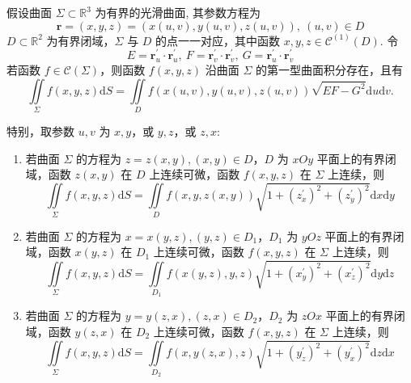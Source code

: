 \begin{theorem}[第一型曲面积分化为二重积分]
    假设曲面 $ \varSigma \subset \mathbb{R}^{3} $ 为有界的光滑曲面, 其参数方程为
    $$\boldsymbol{r}=(x, y, z)=(x(u, v), y(u, v), z(u, v)), ~ (u, v) \in D$$
    $D \subset \mathbb{R}^{2} $ 为有界闭域，$\varSigma $ 与 $ D $ 的点一一对应，其中函数 $ x, y, z \in \mathscr{C}^{(1)}(D) $. 令
    $$E=\boldsymbol{r}_{u}^{\prime} \cdot \boldsymbol{r}_{u}^{\prime}, ~  F=\boldsymbol{r}_{v}^{\prime} \cdot \boldsymbol{r}_{v}^{\prime}, ~  G=\boldsymbol{r}_{u}^{\prime} \cdot \boldsymbol{r}_{v}^{\prime}$$
    若函数 $ f \in \mathscr{C}(\varSigma) $，则函数 $ f(x, y, z) $ 沿曲面 $ \varSigma $ 的第一型曲面积分存在，且有
    $$\iint\limits_{\varSigma} f(x, y, z) \mathrm{d} S=\iint\limits_{D} f(x(u, v), y(u, v), z(u, v)) \sqrt{EF-G^{2}} \mathrm{d} u \mathrm{d} v.$$
    
    特别，取参数 $ u, v $ 为 $ x, y $，或 $ y, z $，或 $ z, x $:
    \begin{enumerate}[label=(\arabic{*})]
        \item 若曲面 $ \varSigma $ 的方程为 $ z=z(x, y),(x, y) \in D$，$D $ 为 $ x O y $ 平面上的有界闭域，函数 $ z(x, y) $ 在 $ D $ 上连续可微，函数 $ f(x, y, z) $ 在 $ \varSigma $ 上连续，则
              $$\iint\limits_{\varSigma} f(x, y, z) \mathrm{d} S=\iint\limits_{D} f(x, y, z(x, y)) \sqrt{1+\left(z_{x}^{\prime}\right)^{2}+\left(z_{y}^{\prime}\right)^{2}} \mathrm{d} x \mathrm{d} y$$
        \item 若曲面 $ \varSigma $ 的方程为 $ x=x(y, z),(y, z) \in D_{1}$，$D_{1} $ 为 $ y O z $ 平面上的有界闭域，函数 $ x(y, z) $ 在 $ D_{1} $ 上连续可微，函数 $ f(x, y, z) $ 在 $ \varSigma $ 上连续，则
              $$\iint\limits_{\varSigma} f(x, y, z) \mathrm{d} S=\iint\limits_{D_{1}} f(x(y, z), y, z) \sqrt{1+\left(x_{y}^{\prime}\right)^{2}+\left(x_{z}^{\prime}\right)^{2}} \mathrm{d} y \mathrm{d} z$$
        \item 若曲面 $ \varSigma $ 的方程为 $ y=y(z, x),(z, x) \in D_{2}$，$D_{2} $ 为 $ z O x $ 平面上的有界闭域，函数 $ y(z, x) $ 在 $ D_{2} $ 上连续可微，函数 $ f(x, y, z) $ 在 $ \varSigma $ 上连续，则
              $$\iint\limits_{\varSigma} f(x, y, z) \mathrm{d} S=\iint\limits_{D_{2}} f(x, y(z, x), z) \sqrt{1+\left(y_{z}^{\prime}\right)^{2}+\left(y_{x}^{\prime}\right)^{2}} \mathrm{d} z \mathrm{d} x$$
    \end{enumerate}
\end{theorem}

